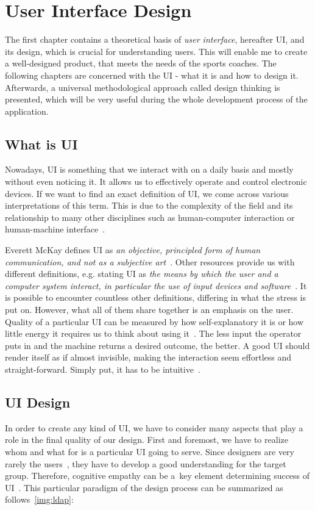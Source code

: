 \chapter{User Interface Design}\label{uidesign}
The first chapter contains a theoretical basis of \textit{user interface}, hereafter UI, and its design, which is crucial for understanding users. This will enable me to create a well-designed product, that meets the needs of the sports coaches. The following chapters are concerned with the UI - what it is and how to design it. Afterwards, a universal methodological approach called design thinking is presented, which will be very useful during the whole development process of the application.

\section{What is UI}
Nowadays, UI is something that we interact with on a daily basis and mostly without even noticing it. It allows us to effectively operate and control electronic devices. If we want to find an exact definition of UI, we come across various interpretations of this term. This is due to the complexity of the field and its relationship to many other disciplines such as human-computer interaction or human-machine interface~\cite{Dix}.

Everett McKay defines UI as {\it an objective, principled form of human communication, and not as a subjective art}~\cite{McKay}. Other resources provide us with different definitions, e.g. stating UI as {\it the means by which the user and a computer system interact, in particular the use of input devices and software}~\cite{Oxford}. It is possible to encounter countless other definitions, differing in what the stress is put on. However, what all of them share together is an emphasis on the user. Quality of a particular UI can be measured by how self-explanatory it is or how little energy it requires us to think about using it~\cite{Krug}. The less input the operator puts in and the machine returns a desired outcome, the better. A good UI should render itself as if almost invisible, making the interaction seem effortless and straight-forward. Simply put, it has to be intuitive~\cite{Norman}.

\section{UI Design}
In order to create any kind of UI, we have to consider many aspects that play a role in the final quality of our design. First and foremost, we have to realize whom and what for is a particular UI going to serve. Since designers are very rarely the users~\cite{Norman}, they have to develop a good understanding for the target group. Therefore, cognitive empathy can be a~key element determining success of UI~\cite{Young}. This particular paradigm of the design process can be summarized as follows~\ref{img:ldap}:

